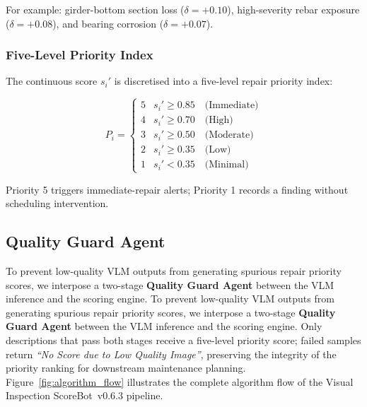 \documentclass[twocolumn]{article}
\begin{document}
For example: girder-bottom section loss ($\delta=+0.10$), high-severity rebar
exposure ($\delta=+0.08$), and bearing corrosion ($\delta=+0.07$).

\subsubsection{Five-Level Priority Index}

The continuous score $s_i'$ is discretised into a five-level repair
priority index:

\begin{equation}
  P_i = \begin{cases}
    5 & s_i' \geq 0.85 \quad \text{(Immediate)} \\
    4 & s_i' \geq 0.70 \quad \text{(High)} \\
    3 & s_i' \geq 0.50 \quad \text{(Moderate)} \\
    2 & s_i' \geq 0.35 \quad \text{(Low)} \\
    1 & s_i' <  0.35 \quad \text{(Minimal)}
  \end{cases}
  \label{eq:priority}
\end{equation}

Priority 5 triggers immediate-repair alerts; Priority 1 records a finding
without scheduling intervention.

\subsection{Quality Guard Agent}
\label{sec:quality_guard}

To prevent low-quality VLM outputs from generating spurious repair priority
scores, we interpose a two-stage \textbf{Quality Guard Agent} between the
VLM inference and the scoring engine.
To prevent low-quality VLM outputs from generating spurious repair priority
scores, we interpose a two-stage \textbf{Quality Guard Agent} between the
VLM inference and the scoring engine.
Only descriptions that pass both stages receive a five-level priority score;
failed samples return \textit{``No Score due to Low Quality Image''}, preserving
the integrity of the priority ranking for downstream maintenance planning.
Figure~\ref{fig:algorithm_flow} illustrates the complete algorithm flow
of the Visual Inspection ScoreBot~v0.6.3 pipeline.
\end{document}

